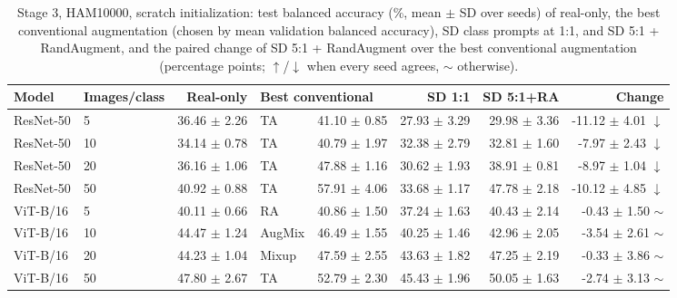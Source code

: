 \begin{table}[H]
\centering
\small
\setlength{\tabcolsep}{4pt}
\caption{Stage 3, HAM10000, scratch initialization: test balanced accuracy (\%, mean $\pm$ SD over seeds) of real-only, the best conventional augmentation (chosen by mean validation balanced accuracy), SD class prompts at 1:1, and SD 5:1 + RandAugment, and the paired change of SD 5:1 + RandAugment over the best conventional augmentation (percentage points; $\uparrow$/$\downarrow$ when every seed agrees, $\sim$ otherwise).}
\label{tab:stage3-ham10000-scores-scratch-test}
\begin{tabular}{llrlrrrr}
\toprule
Model & Images/class & Real-only & \multicolumn{2}{l}{Best conventional} & SD 1:1 & SD 5:1+RA & Change \\
\midrule
ResNet-50 & 5 & 36.46 $\pm$ 2.26 & TA & 41.10 $\pm$ 0.85 & 27.93 $\pm$ 3.29 & 29.98 $\pm$ 3.36 & -11.12 $\pm$ 4.01 $\downarrow$ \\
ResNet-50 & 10 & 34.14 $\pm$ 0.78 & TA & 40.79 $\pm$ 1.97 & 32.38 $\pm$ 2.79 & 32.81 $\pm$ 1.60 & -7.97 $\pm$ 2.43 $\downarrow$ \\
ResNet-50 & 20 & 36.16 $\pm$ 1.06 & TA & 47.88 $\pm$ 1.16 & 30.62 $\pm$ 1.93 & 38.91 $\pm$ 0.81 & -8.97 $\pm$ 1.04 $\downarrow$ \\
ResNet-50 & 50 & 40.92 $\pm$ 0.88 & TA & 57.91 $\pm$ 4.06 & 33.68 $\pm$ 1.17 & 47.78 $\pm$ 2.18 & -10.12 $\pm$ 4.85 $\downarrow$ \\
ViT-B/16 & 5 & 40.11 $\pm$ 0.66 & RA & 40.86 $\pm$ 1.50 & 37.24 $\pm$ 1.63 & 40.43 $\pm$ 2.14 & -0.43 $\pm$ 1.50 $\sim$ \\
ViT-B/16 & 10 & 44.47 $\pm$ 1.24 & AugMix & 46.49 $\pm$ 1.55 & 40.25 $\pm$ 1.46 & 42.96 $\pm$ 2.05 & -3.54 $\pm$ 2.61 $\sim$ \\
ViT-B/16 & 20 & 44.23 $\pm$ 1.04 & Mixup & 47.59 $\pm$ 2.55 & 43.63 $\pm$ 1.82 & 47.25 $\pm$ 2.19 & -0.33 $\pm$ 3.86 $\sim$ \\
ViT-B/16 & 50 & 47.80 $\pm$ 2.67 & TA & 52.79 $\pm$ 2.30 & 45.43 $\pm$ 1.96 & 50.05 $\pm$ 1.63 & -2.74 $\pm$ 3.13 $\sim$ \\
\bottomrule
\end{tabular}
\end{table}
